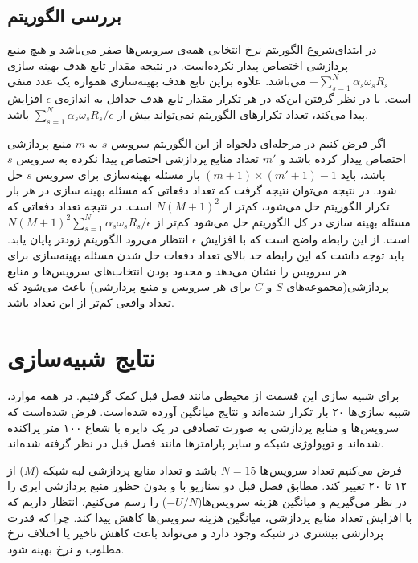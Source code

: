     \subsection{بررسی الگوریتم}
      در ابتدای‌شروع الگوریتم نرخ انتخابی همه‌ی سرویس‌ها صفر می‌باشد و هیچ منبع پردازشی اختصاص پیدار نکرده‌است.
      در نتیجه مقدار تابع هدف بهینه سازی $-\sum_{s=1}^N \alpha_s \omega_s R_s$ می‌باشد.
      علاوه براین تابع هدف بهینه‌سازی همواره یک عدد منفی است.
      با در نظر گرفتن این‌که در هر تکرار مقدار تابع هدف حداقل به اندازه‌ی $\epsilon$ افزایش پیدا می‌کند، تعداد تکرار‌های الگوریتم نمی‌تواند بیش از $\sum_{s=1}^N  \alpha_s \omega_s R_s / \epsilon$  باشد.
      
      اگر فرض کنیم در مرحله‌ای دلخواه از این الگوریتم سرویس $s$ به $m$ منبع پردازشی اختصاص پیدار کرده باشد و $m'$ تعداد منابع پردازشی اختصاص پیدا نکرده به سرویس $s$ باشد، باید $(m+1) \times (m'+1) - 1$ بار مسئله بهینه‌سازی برای سرویس $s$ حل شود.
      در نتیجه می‌توان نتیجه گرفت که تعداد دفعاتی که مسئله بهینه سازی در هر بار تکرار الگوریتم حل می‌شود، کم‌تر از $N(M+1)^2$ است.
      در نتیجه تعداد دفعاتی که مسئله بهینه سازی در کل الگوریتم حل می‌شود کم‌تر از $N(M+1)^2 \sum_{s=1}^N  \alpha_s \omega_s R_s / \epsilon$ است.
      از این رابطه واضح است که با افزایش $\epsilon$ انتظار می‌رود الگوریتم زود‌تر پایان یابد.
      باید توجه داشت که این رابطه حد بالای تعداد دفعات حل شدن مسئله بهینه‌سازی برای هر سرویس را نشان می‌دهد و محدود بودن انتخاب‌های سرویس‌ها و منابع پردازشی(مجموعه‌های $S$ و $C$ برای هر سرویس و منبع پردازشی) باعث می‌شود که تعداد واقعی کم‌تر از این تعداد باشد.

  \section{نتایج شبیه‌سازی}
    برای شبیه سازی این قسمت از محیطی مانند فصل قبل کمک گرفتیم.
    در همه موارد، شبیه سازی‌ها ۲۰ بار تکرار شده‌اند و نتایج میانگین آورده شده‌است.
    فرض شده‌است که سرویس‌ها و منابع پردازشی به صورت تصادفی در یک دایره با شعاع ۱۰۰ متر پراکنده شده‌اند و توپولوژی شبکه و سایر پارامتر‌ها مانند فصل قبل در نظر گرفته شده‌اند.
    
    فرض می‌کنیم تعداد سرویس‌ها $N=15$ باشد و تعداد منابع پردازشی لبه شبکه ($M$) از ۱۲ تا ۲۰ تغییر کند.
    مطابق فصل قبل دو سناریو با و بدون حظور منبع پردازشی ابری را در نظر می‌گیریم و میانگین هزینه سرویس‌ها($-U/N$) را رسم می‌کنیم.
    انتظار داریم که با افزایش تعداد منابع پردازشی، میانگین هزینه سرویس‌ها کاهش پیدا کند. چرا که قدرت پردازشی بیشتری در شبکه وجود دارد و می‌تواند باعث کاهش تاخیر یا اختلاف نرخ مطلوب و نرخ بهینه شود.

